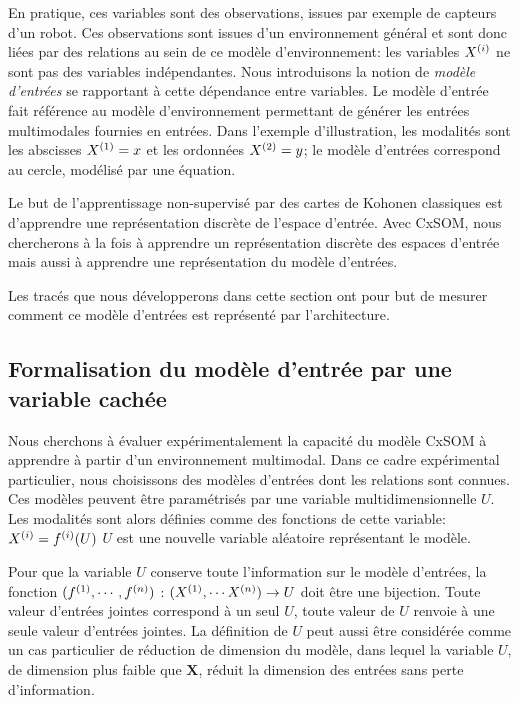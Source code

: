 \documentclass[../main]{subfiles}
\begin{document}
En pratique, ces variables sont des observations, issues par exemple de capteurs d'un robot. Ces observations sont issues d'un environnement général et sont donc liées par des relations au sein de ce modèle d'environnement: les variables $X^{({i})}$ ne sont pas des variables indépendantes.
Nous introduisons la notion de \emph{modèle d'entrées} se rapportant à cette dépendance entre variables.
Le modèle d'entrée fait référence au modèle d'environnement permettant de générer les entrées multimodales fournies en entrées. Dans l'exemple d'illustration, les modalités sont les abscisses $X^{({1})} = x$ et les ordonnées $X^{({2})} = y$; le modèle d'entrées correspond au cercle, modélisé par une équation.

Le but de l'apprentissage non-supervisé par des cartes de Kohonen classiques est d'apprendre une représentation discrète de l'espace d'entrée.
Avec CxSOM, nous chercherons à la fois à apprendre un représentation discrète des espaces d'entrée mais aussi à apprendre une représentation du modèle d'entrées.

Les tracés que nous développerons dans cette section ont pour but de mesurer comment ce modèle d'entrées est représenté par l'architecture. 

\subsection{Formalisation du modèle d'entrée par une variable cachée}

Nous cherchons à évaluer expérimentalement la capacité du modèle CxSOM à apprendre à partir d'un environnement multimodal. Dans ce cadre expérimental particulier, nous choisissons des modèles d'entrées dont les relations sont connues. 
Ces modèles peuvent être paramétrisés par une variable multidimensionnelle $U$. Les modalités sont alors définies comme des fonctions de cette variable:
$X^{({i})} = f^{({i})}(U)$
$U$ est une nouvelle variable aléatoire représentant le modèle.

Pour que la variable $U$ conserve toute l'information sur le modèle d'entrées, la fonction $(f^{({1})}, \cdots, f^{({n})})$ : $(X^{({1})}, \cdots X^{({n})})\rightarrow U$ doit être une bijection. Toute valeur d'entrées jointes correspond à un seul $U$, toute valeur de $U$ renvoie à une seule valeur d'entrées jointes. 
La définition de $U$ peut aussi être considérée comme un cas particulier de réduction de dimension du modèle, dans lequel la variable $U$, de dimension plus faible que $\mathbf{X}$, réduit la dimension des entrées sans perte d'information.
\end{document}
